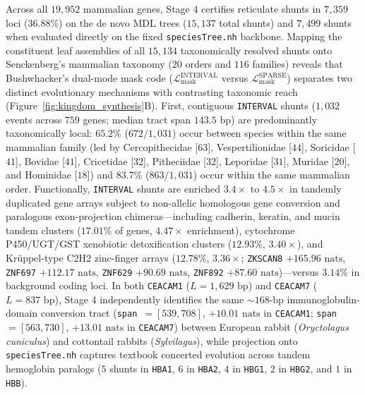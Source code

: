 \documentclass[11pt,a4paper]{article}
\begin{document}
Across all $19,952$ mammalian genes, Stage 4 certifies reticulate shunts in $7,359$ loci ($36.88\%$) on the de novo MDL trees ($15,137$ total shunts) and $7,499$ shunts when evaluated directly on the fixed \texttt{speciesTree.nh} backbone. Mapping the constituent leaf assemblies of all $15,134$ taxonomically resolved shunts onto Senckenberg's mammalian taxonomy ($20$ orders and $116$ families) reveals that Bushwhacker's dual-mode mask code ($\mathcal{L}_{\text{mask}}^{\text{INTERVAL}}$ versus $\mathcal{L}_{\text{mask}}^{\text{SPARSE}}$) separates two distinct evolutionary mechanisms with contrasting taxonomic reach (Figure~\ref{fig:kingdom_synthesis}B). First, contiguous \texttt{INTERVAL} shunts ($1,032$ events across $759$ genes; median tract span $143.5\text{ bp}$) are predominantly taxonomically local: $65.2\%$ ($672 / 1,031$) occur between species within the same mammalian family (led by Cercopithecidae [$63$], Vespertilionidae [$44$], Soricidae [$41$], Bovidae [$41$], Cricetidae [$32$], Pitheciidae [$32$], Leporidae [$31$], Muridae [$20$], and Hominidae [$18$]) and $83.7\%$ ($863 / 1,031$) occur within the same mammalian order. Functionally, \texttt{INTERVAL} shunts are enriched $3.4\times$ to $4.5\times$ in tandemly duplicated gene arrays subject to non-allelic homologous gene conversion and paralogous exon-projection chimeras---including cadherin, keratin, and mucin tandem clusters ($17.01\%$ of genes, $4.47\times$ enrichment), cytochrome P450/UGT/GST xenobiotic detoxification clusters ($12.93\%$, $3.40\times$), and Kr\"uppel-type C2H2 zinc-finger arrays ($12.78\%$, $3.36\times$; \texttt{ZKSCAN8} $+165.96\text{ nats}$, \texttt{ZNF697} $+112.17\text{ nats}$, \texttt{ZNF629} $+90.69\text{ nats}$, \texttt{ZNF892} $+87.60\text{ nats}$)---versus $3.14\%$ in background coding loci. In both \texttt{CEACAM1} ($L = 1,629\text{ bp}$) and \texttt{CEACAM7} ($L = 837\text{ bp}$), Stage 4 independently identifies the same $\sim 168\text{-bp}$ immunoglobulin-domain conversion tract (\texttt{span}~$=[539, 708]$, $+10.01\text{ nats}$ in \texttt{CEACAM1}; \texttt{span}~$=[563, 730]$, $+13.01\text{ nats}$ in \texttt{CEACAM7}) between European rabbit (\textit{Oryctolagus cuniculus}) and cottontail rabbits (\textit{Sylvilagus}), while projection onto \texttt{speciesTree.nh} captures textbook concerted evolution across tandem hemoglobin paralogs ($5$ shunts in \texttt{HBA1}, $6$ in \texttt{HBA2}, $4$ in \texttt{HBG1}, $2$ in \texttt{HBG2}, and $1$ in \texttt{HBB}).
\end{document}
